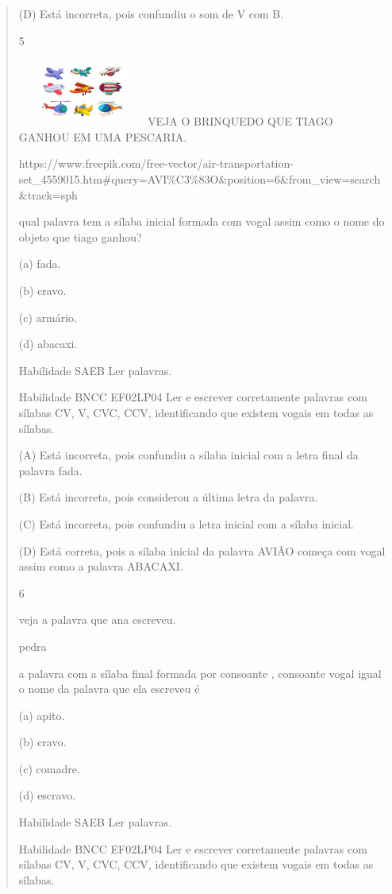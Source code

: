 \begin{verse}
{{{{(D) Está incorreta, pois confundiu o som de V com B.

\num{5}

\includegraphics[width=1.69097in,height=0.86538in]{media/image177.jpeg}VEJA
O BRINQUEDO QUE TIAGO GANHOU EM UMA PESCARIA.

https://www.freepik.com/free-vector/air-transportation-set\_4559015.htm\#query=AVI\%C3\%83O\&position=6\&from\_view=search\&track=sph

qual palavra tem a sílaba inicial formada com vogal assim como o nome do
objeto que tiago ganhou?

(a) fada.

(b) cravo.

(c) armário.

(d) abacaxi.

Habilidade SAEB Ler palavras.

Habilidade BNCC EF02LP04 Ler e escrever corretamente palavras com
sílabas CV, V, CVC, CCV, identificando que existem vogais em todas as
sílabas.

(A) Está incorreta, pois confundiu a sílaba inicial com a letra final da
palavra fada.

(B) Está incorreta, pois considerou a última letra da palavra.

(C) Está incorreta, pois confundiu a letra inicial com a sílaba inicial.

(D) Está correta, pois a sílaba inicial da palavra AVIÃO começa com
vogal assim como a palavra ABACAXI.

\num{6}

veja a palavra que ana escreveu.

pedra

a palavra com a sílaba final formada por consoante , consoante vogal
igual o nome da palavra que ela escreveu é

(a) apito.

(b) cravo.

(c) comadre.

(d) escravo.

Habilidade SAEB Ler palavras.

Habilidade BNCC EF02LP04 Ler e escrever corretamente palavras com
sílabas CV, V, CVC, CCV, identificando que existem vogais em todas as
sílabas.

}}}}
\end{verse}
